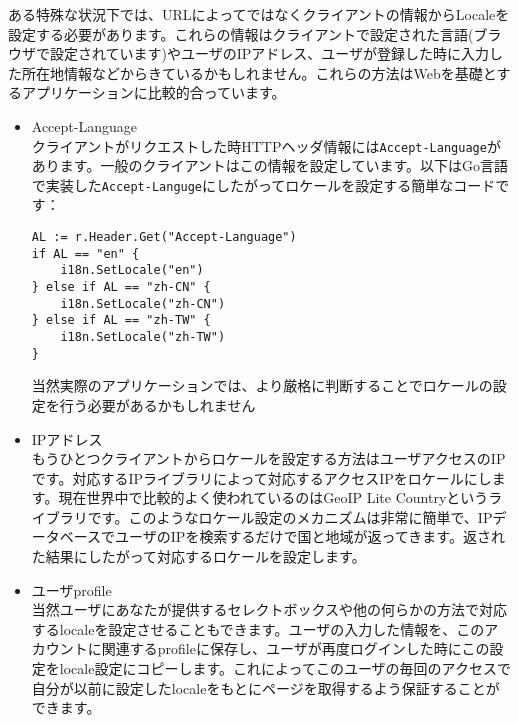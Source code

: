 ある特殊な状況下では、URLによってではなくクライアントの情報からLocaleを設定する必要があります。これらの情報はクライアントで設定された言語(ブラウザで設定されています)やユーザのIPアドレス、ユーザが登録した時に入力した所在地情報などからきているかもしれません。これらの方法はWebを基礎とするアプリケーションに比較的合っています。
\begin{itemize}
\item Accept-Language\\
  クライアントがリクエストした時HTTPヘッダ情報には\texttt{Accept-Language}があります。一般のクライアントはこの情報を設定しています。以下はGo言語で実装した\texttt{Accept-Languge}にしたがってロケールを設定する簡単なコードです：
\begin{lstlisting}[numbers=none]
AL := r.Header.Get("Accept-Language")
if AL == "en" {
    i18n.SetLocale("en")
} else if AL == "zh-CN" {
    i18n.SetLocale("zh-CN")
} else if AL == "zh-TW" {
    i18n.SetLocale("zh-TW")
}
\end{lstlisting}
当然実際のアプリケーションでは、より厳格に判断することでロケールの設定を行う必要があるかもしれません
\item IPアドレス\\
  もうひとつクライアントからロケールを設定する方法はユーザアクセスのIPです。対応するIPライブラリによって対応するアクセスIPをロケールにします。現在世界中で比較的よく使われているのはGeoIP Lite Countryというライブラリです。このようなロケール設定のメカニズムは非常に簡単で、IPデータベースでユーザのIPを検索するだけで国と地域が返ってきます。返された結果にしたがって対応するロケールを設定します。
  \item ユーザprofile\\
当然ユーザにあなたが提供するセレクトボックスや他の何らかの方法で対応するlocaleを設定させることもできます。ユーザの入力した情報を、このアカウントに関連するprofileに保存し、ユーザが再度ログインした時にこの設定をlocale設定にコピーします。これによってこのユーザの毎回のアクセスで自分が以前に設定したlocaleをもとにページを取得するよう保証することができます。
\end{itemize}
